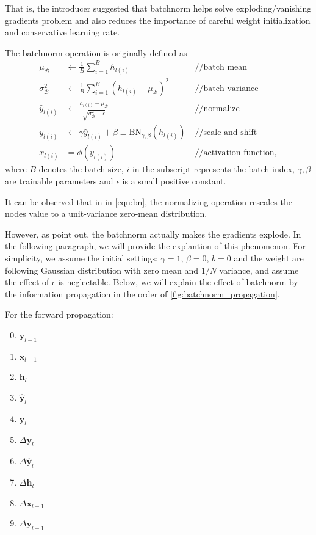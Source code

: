 That is, the introducer suggested that batchnorm helps solve exploding/vanishing gradients problem and
also reduces the importance of careful weight initialization and conservative learning rate.

The batchnorm operation is originally defined as
\begin{equation}
    \begin{aligned}
        \mu_\mathcal{B}&\leftarrow\frac{1}{B}\sum_{i=1}^{B}h_{l(i)}
        &//\text{batch mean}\\
        \sigma_\mathcal{B}^2&\leftarrow\frac{1}{B}\sum_{i=1}^{B}(h_{l(i)}-\mu_\mathcal{B})^2\;
        &//\text{batch variance}\\
        \widehat{y}_{l(i)}&\leftarrow\frac{h_{l(i)}-\mu_\mathcal{B}}{\sqrt{\sigma_\mathcal{B}^2+\epsilon}}
        &//\text{normalize}\\
        y_{l(i)}&\leftarrow\gamma\widehat{y}_{l(i)}+\beta\equiv\text{BN}_{\gamma,\beta}(h_{l(i)})\;
        &//\text{scale and shift}\\
        x_{l(i)}&=\phi(y_{l(i)})
        &//\text{activation function},
    \end{aligned}
    \label{eqn:bn}
\end{equation}
where $B$ denotes the batch size, $i$ in the subscript represents the batch index, $\gamma, \beta$ are
trainable parameters and $\epsilon$ is a small positive constant.

It can be observed that in in \eqref{eqn:bn}, the normalizing operation rescales the nodes value
to a unit-variance zero-mean distribution. %

However, as \cite{mft:bn, explode_bn} point out, the batchnorm actually makes the gradients explode.
In the following paragraph, we will provide the explantion of this phenomenon.
For simplicity, we assume the initial settings: $\gamma=1$, $\beta=0$, $b=0$ and the weight
are following Gaussian distribution with zero mean and $1/N$ variance, and assume the effect of
$\epsilon$ is neglectable. Below, we will explain the effect of batchnorm by the information
propagation in the order of \ref{fig:batchnorm_propagation}.

For the forward propagation:
\begin{enumerate}
    \setcounter{enumi}{-1}
    \item $\mathbf{y}_{l-1}$
    \item $\mathbf{x}_{l-1}$
    \item $\mathbf{h}_{l}$
    \item $\widehat{\mathbf{y}}_{l}$
    \item $\mathbf{y}_{l}$
    \item $\Delta\mathbf{y}_{l}$
    \item $\Delta\widehat{\mathbf{y}}_{l}$
    \item $\Delta\mathbf{h}_{l}$
    \item $\Delta\mathbf{x}_{l-1}$
    \item $\Delta\mathbf{y}_{l-1}$
\end{enumerate}

